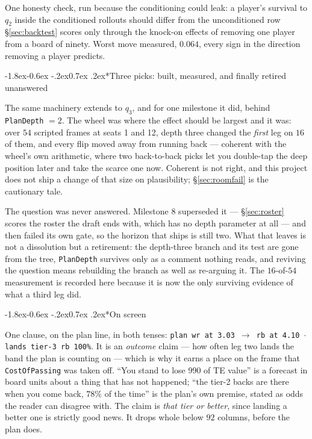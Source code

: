\documentclass[10pt,a4paper]{article}
\makeatletter
\theoremstyle{plain}
\theoremstyle{definition}
\theoremstyle{remark}
\newcommand{\code}[1]{\texttt{\small #1}}
\renewcommand\subsubsection{\@startsection{subsubsection}{3}{\z@}%
  {-1.8ex\@plus -0.6ex \@minus -.2ex}{0.7ex \@plus .2ex}{\normalfont\normalsize\bfseries}}
\makeatother
\begin{document}
One honesty check, run because the conditioning could leak: a player's survival to $q_2$
inside the conditioned rollouts should differ from the unconditioned row
\S\ref{sec:backtest} scores only through the knock-on effects of removing one player from
a board of ninety. Worst move measured, $0.064$, every sign in the direction removing a
player predicts.

\subsubsection*{Three picks: built, measured, and finally retired unanswered}

The same machinery extends to $q_3$, and for one milestone it did, behind
\code{PlanDepth} $= 2$. The wheel was where the effect should be largest and it was: over
$54$ scripted frames at seats 1 and 12, depth three changed the \emph{first} leg on $16$
of them, and every flip moved away from running back --- coherent with the wheel's own
arithmetic, where two back-to-back picks let you double-tap the deep position later and
take the scarce one now. Coherent is not right, and this project does not ship a change of
that size on plausibility; \S\ref{sec:roomfail} is the cautionary tale.

The question was never answered. Milestone 8 superseded it --- \S\ref{sec:roster} scores
the roster the draft ends with, which has no depth parameter at all --- and then failed its
own gate, so the horizon that ships is still two. What that leaves is not a dissolution but
a retirement: the depth-three branch and its test are gone from the tree, \code{PlanDepth}
survives only as a comment nothing reads, and reviving the question means rebuilding the
branch as well as re-arguing it. The $16$-of-$54$ measurement is recorded here because it
is now the only surviving evidence of what a third leg did.

\subsubsection*{On screen}

One clause, on the plan line, in both tenses: \code{plan wr at 3.03 $\to$ rb at 4.10
$\cdot$ lands tier-3 rb 100\%}. It is an \emph{outcome} claim --- how often leg two lands
the band the plan is counting on --- which is why it earns a place on the frame that
\code{CostOfPassing} was taken off. ``You stand to lose 990 of TE value'' is a forecast in
board units about a thing that has not happened; ``the tier-2 backs are there when you
come back, $78\%$ of the time'' is the plan's own premise, stated as odds the reader can
disagree with. The claim is \emph{that tier or better}, since landing a better one is
strictly good news. It drops whole below $92$ columns, before the plan does.
\end{document}
